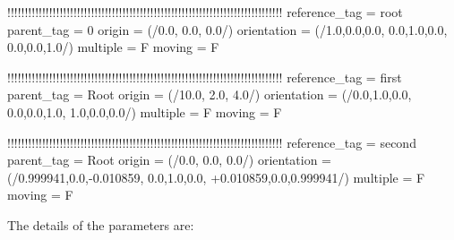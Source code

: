 \begin{inputfile}[frame=single, caption={references\_static.in}, 
    label={file:references_static.in}]
!!!!!!!!!!!!!!!!!!!!!!!!!!!!!!!!!!!!!!!!!!!!!!!!!!!!!!!!!!!!!!!!!!!!!!!!!!!!!!!
reference_tag = root
parent_tag = 0
origin = (/0.0, 0.0, 0.0/)
orientation = (/1.0,0.0,0.0, 0.0,1.0,0.0, 0.0,0.0,1.0/)
multiple = F
moving = F

!!!!!!!!!!!!!!!!!!!!!!!!!!!!!!!!!!!!!!!!!!!!!!!!!!!!!!!!!!!!!!!!!!!!!!!!!!!!!!!
reference_tag = first
parent_tag = Root
origin = (/10.0, 2.0, 4.0/)
orientation = (/0.0,1.0,0.0, 0.0,0.0,1.0, 1.0,0.0,0.0/)
multiple = F
moving = F

!!!!!!!!!!!!!!!!!!!!!!!!!!!!!!!!!!!!!!!!!!!!!!!!!!!!!!!!!!!!!!!!!!!!!!!!!!!!!!!
reference_tag = second
parent_tag = Root
origin = (/0.0, 0.0, 0.0/)
orientation = (/0.999941,0.0,-0.010859, 0.0,1.0,0.0, +0.010859,0.0,0.999941/)
multiple = F
moving = F
\end{inputfile}
The details of the parameters are:
